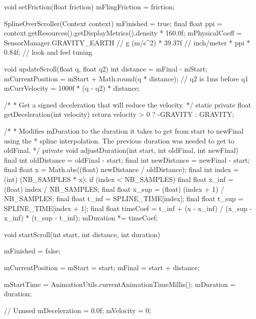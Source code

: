 {{        void setFriction(float friction) {
            mFlingFriction = friction;
        }

        SplineOverScroller(Context context) {
            mFinished = true;
            final float ppi = context.getResources().getDisplayMetrics().density * 160.0f;
            mPhysicalCoeff = SensorManager.GRAVITY_EARTH // g (m/s^2)
                    * 39.37f // inch/meter
                    * ppi
                    * 0.84f; // look and feel tuning
        }

        void updateScroll(float q, float q2) {
            int distance = mFinal - mStart;
            mCurrentPosition = mStart + Math.round(q * distance);
            // q2 is 1ms before q1
            mCurrVelocity = 1000f * (q - q2) * distance;
        }

        /*
         * Get a signed deceleration that will reduce the velocity.
         */
        static private float getDeceleration(int velocity) {
            return velocity > 0 ? -GRAVITY : GRAVITY;
        }

        /*
         * Modifies mDuration to the duration it takes to get from start to newFinal using the
         * spline interpolation. The previous duration was needed to get to oldFinal.
         */
        private void adjustDuration(int start, int oldFinal, int newFinal) {
            final int oldDistance = oldFinal - start;
            final int newDistance = newFinal - start;
            final float x = Math.abs((float) newDistance / oldDistance);
            final int index = (int) (NB_SAMPLES * x);
            if (index < NB_SAMPLES) {
                final float x_inf = (float) index / NB_SAMPLES;
                final float x_sup = (float) (index + 1) / NB_SAMPLES;
                final float t_inf = SPLINE_TIME[index];
                final float t_sup = SPLINE_TIME[index + 1];
                final float timeCoef = t_inf + (x - x_inf) / (x_sup - x_inf) * (t_sup - t_inf);
                mDuration *= timeCoef;
            }
        }

        void startScroll(int start, int distance, int duration) {
            mFinished = false;

            mCurrentPosition = mStart = start;
            mFinal = start + distance;

            mStartTime = AnimationUtils.currentAnimationTimeMillis();
            mDuration = duration;

            // Unused
            mDeceleration = 0.0f;
            mVelocity = 0;
        }

}}
